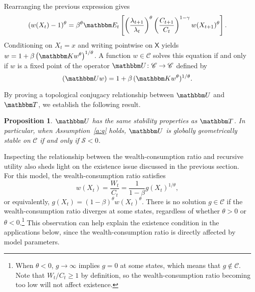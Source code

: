 \documentclass[12pt, reqno]{amsart}
\renewcommand{\geq}{\geqslant}
\newcommand{\1}{\mathbbm 1}
\newcommand{\cC}{\mathscr C}
\newcommand{\sS}{\mathscr S}
\newcommand{\UU}{\mathbbm U}
\newcommand{\KK}{\mathbbm K}
\newcommand{\EE}{\mathbbm E}
\newcommand{\TT}{\mathbbm T}
\newcommand{\XX}{\mathsf X}
\theoremstyle{plain}
\newtheorem{proposition}[theorem]{Proposition}
\theoremstyle{definition}
\begin{document}
Rearranging the previous expression gives
%
\begin{equation*}
    (w(X_t)-1)^\theta
    = \beta^{\theta}
    \EE_t
    \left[
    \left( \frac{\lambda_{t+1}}{\lambda_t} \right)^\theta
        \left( \frac{C_{t+1}}{C_t} \right)^{1-\gamma}
        w(X_{t+1})^\theta
    \right].
\end{equation*}
%
Conditioning on $X_t = x$ and writing pointwise on $\XX$ yields $w = 1 +
\beta \left( \KK w^\theta \right)^{1/\theta}$.  A function $w \in \cC$ solves
this equation if and only if $w$ is a fixed point of the operator $\UU \colon
\cC \to \cC$ defined by 
%
\begin{equation}\label{eq:wcop}
    (\UU w) = 1 + \beta \,  (\KK w^\theta)^{1/\theta}.
\end{equation}
%

By proving a topological conjugacy relationship between $\UU$ and $\TT$, we
establish the following result.

\begin{proposition}\label{p:wcr}
    $\UU$ has the same stability properties as $\TT$.  In particular, when
    Assumption~\ref{a:q} holds, $\UU$ is globally geometrically stable on
    $\cC$  if and only if $\sS < 0$.
\end{proposition}


Inspecting the relationship between the wealth-consumption ratio and
recursive utility also sheds light on the existence issue discussed in the
previous section. For this model, the wealth-consumption ratio satisfies
%
\begin{equation}\label{eq:wc}
    w(X_t) = \frac{W_t}{C_t} 
    = \frac{1}{1-\beta} g(X_t)^{1/\theta},
\end{equation}
%
or equivalently, $g(X_t) = (1-\beta)^\theta w(X_t)^\theta$. There is no
solution $g \in \cC$ if the wealth-consumption ratio diverges at some
states, regardless of whether $\theta > 0$ or $\theta < 0$.\footnote{When
  $\theta < 0$, $g \to \infty$ implies $g = 0$ at some states, which means
  that $g \notin \cC$. Note that $W_t/C_t \geq 1$ by definition, so the
  wealth-consumption ratio becoming too low will not affect existence.} This
observation can help explain the existence condition in the applications
below, since the wealth-consumption ratio is directly affected by model
parameters.
\end{document}
